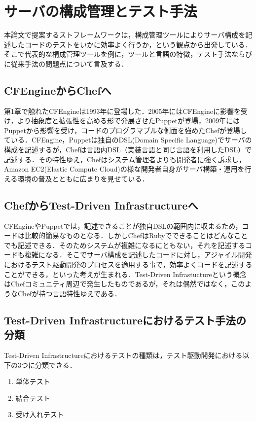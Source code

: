 \section{サーバの構成管理とテスト手法}

本論文で提案するストフレームワークは，構成管理ツールによりサーバ構成を記述したコードのテストをいかに効率よく行うか，という観点から出発している．そこで代表的な構成管理ツールを例に，ツールと言語の特徴，テスト手法ならびに従来手法の問題点について言及する．

\subsection{CFEngineからChefへ}

第1章で触れたCFEngineは1993年に登場した．2005年にはCFEngineに影響を受け，より抽象度と拡張性を高める形で発展させたPuppet\cite{puppet}が登場，2009年にはPuppetから影響を受け，コードのプログラマブルな側面を強めたChef\cite{chef}が登場している．CFEngine，Puppetは独自のDSL(Domain Specific Language)でサーバの構成を記述するが，Chefは言語内DSL（実装言語と同じ言語を利用したDSL）で記述する．その特性ゆえ，Chefはシステム管理者よりも開発者に強く訴求し，Amazon EC2(Elastic Compute Cloud)の様な開発者自身がサーバ構築・運用を行える環境の普及とともに広まりを見せている．

\subsection{ChefからTest-Driven Infrastructureへ}

CFEngineやPuppetでは，記述できることが独自DSLの範囲内に収まるため，コードは比較的簡易なものとなる．しかしChefはRubyでできることはどんなことでも記述できる．そのためシステムが複雑になるにともない，それを記述するコードも複雑になる．そこでサーバ構成を記述したコードに対し，アジャイル開発におけるテスト駆動開発のプロセスを適用する事で，効率よくコードを記述することができる，といった考えが生まれる．Test-Driven Infrastuctureという概念はChefコミュニティ周辺で発生したものであるが，それは偶然ではなく，このようなChefが持つ言語特性ゆえである．

\subsection{Test-Driven Infrastructureにおけるテスト手法の分類}

Test-Driven Infrastructureにおけるテストの種類は，テスト駆動開発における以下の3つに分類できる．

\begin{enumerate}
  \item 単体テスト
  \item 結合テスト
  \item 受け入れテスト
\end{enumerate}

